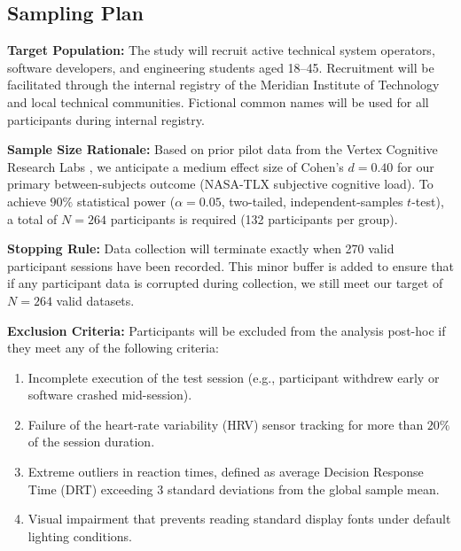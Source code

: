 \subsection{Sampling Plan}
\textbf{Target Population:} The study will recruit active technical system operators, software developers, and engineering students aged 18--45. Recruitment will be facilitated through the internal registry of the Meridian Institute of Technology and local technical communities. Fictional common names will be used for all participants during internal registry.

\textbf{Sample Size Rationale:} Based on prior pilot data from the Vertex Cognitive Research Labs \citep{chen2025hrv}, we anticipate a medium effect size of Cohen's $d = 0.40$ for our primary between-subjects outcome (NASA-TLX subjective cognitive load). 
To achieve $90\%$ statistical power ($\alpha = 0.05$, two-tailed, independent-samples $t$-test), a total of $N = 264$ participants is required (132 participants per group).

\textbf{Stopping Rule:} Data collection will terminate exactly when 270 valid participant sessions have been recorded. This minor buffer is added to ensure that if any participant data is corrupted during collection, we still meet our target of $N = 264$ valid datasets.

\textbf{Exclusion Criteria:} 
Participants will be excluded from the analysis post-hoc if they meet any of the following criteria:
\begin{enumerate}[label=\lbrack\alph*\rbrack]
  \item Incomplete execution of the test session (e.g., participant withdrew early or software crashed mid-session).
  \item Failure of the heart-rate variability (HRV) sensor tracking for more than $20\%$ of the session duration.
  \item Extreme outliers in reaction times, defined as average Decision Response Time (DRT) exceeding 3 standard deviations from the global sample mean.
  \item Visual impairment that prevents reading standard display fonts under default lighting conditions.
\end{enumerate}
